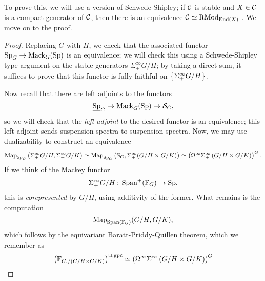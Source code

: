 \documentclass{amsart}
\begin{document}
To prove this, we will use a version of Schwede-Shipley;
if $\mathcal{C}$ is stable and $X \in \mathcal{C}$ is a compact generator of $\mathcal{C}$, then there is an equivalence $\mathcal{C} \simeq \mathrm{RMod}_{\operatorname{End}(X)}$
.
We move on to the proof.
\begin{proof}
  Replacing $G$ with $H$, we check that the associated functor $\operatorname{Sp}_G \rightarrow \mathrm{Mack}_G(\operatorname{Sp})$ is an equivalence;
  we will check this using a Schwede-Shipley type argument on the stable-generators $\Sigma_+^\infty G/H$;
  by taking a direct sum, it suffices to prove that this functor is fully faithful on $\left\{ \Sigma_+^\infty G/H \right\}$.

  Now recall that there are left adjoints to the functors
  \[
    \underline{\operatorname{Sp}}_G \rightarrow \underline{\mathrm{Mack}}_G(\operatorname{Sp}) \rightarrow \mathcal{S}_G,
  \]
  so we will check that the \emph{left adjoint} to the desired functor is an equivalence;
  this left adjoint sends suspension spectra to suspension spectra.
  Now, we may use dualizability to construct an equivalence
  \[
    \operatorname{Map}_{\operatorname{Sp}_G}\left( \Sigma_+^\infty G/H, \Sigma^\infty_+ G/K \right) \simeq \operatorname{Map}_{\operatorname{Sp}_G}\left( \mathbb{S}_G, \Sigma_+^\infty(G/H \times G/K) \right) \simeq \left( \Omega^\infty \Sigma_+^\infty \left( G/H \times G/K \right) \right)^G.
  \]
  If we think of the Mackey functor
  \[
    \Sigma_+^\infty G/H\colon  \operatorname{Span}^+(\mathbb{F}_G) \rightarrow \operatorname{Sp},
  \]
  this is \emph{corepresented} by $G/H$, using additivity of the former.
  What remains is the computation
  \[
    \operatorname{Map}_{\operatorname{Span}(\mathbb{F}_G)}(G/H,G/K),
  \]
  which follows by the equivariant Baratt-Priddy-Quillen theorem, which we remember as
  \[
  \left( \mathbb{F}_{G, /\left( G/H \times G/K \right)} \right)^{\sqcup, \mathrm{gpc}} \simeq \left( \Omega^\infty \Sigma^\infty \left( G/H \times G/K \right) \right)^G
  \]
\end{proof}
\end{document}
